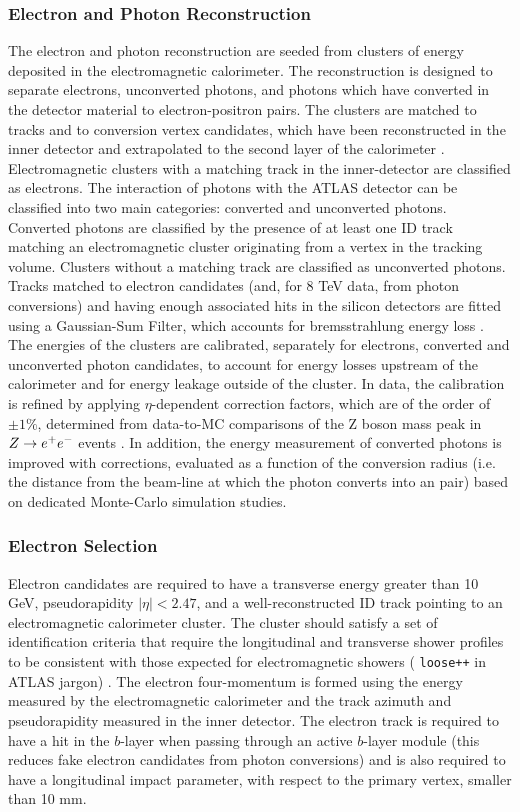 \subsubsection*{Electron and Photon Reconstruction}
The electron and photon reconstruction are seeded from clusters of energy deposited
in the electromagnetic calorimeter. The reconstruction is designed to separate 
electrons, unconverted photons, and photons which have converted in the detector
material to electron-positron pairs. The clusters are matched to tracks and to 
conversion vertex candidates, which have 
been reconstructed in the inner detector and extrapolated to the second layer of
the calorimeter \cite{ATL-PHYS-PUB-2011-007}.
Electromagnetic clusters with a matching track in the inner-detector are classified
as electrons. The interaction of photons with the ATLAS detector can be
classified into two main categories: converted and unconverted photons. Converted
photons are classified by the presence of at least one ID track matching an
electromagnetic cluster originating from a vertex in the tracking volume. Clusters
without a matching track are classified as unconverted photons. Tracks matched
to electron candidates (and, for 8 TeV data, from photon conversions) and having
enough associated hits in the silicon detectors are fitted using a Gaussian-Sum
Filter, which accounts for bremsstrahlung energy loss \cite{ATLAS-CONF-2012-047}.
The energies of the clusters are calibrated, separately for electrons, converted
and unconverted photon candidates, to account for energy losses upstream of the 
calorimeter and for energy leakage outside of the cluster. In data, the calibration 
is refined by applying $\eta$-dependent correction factors, which are of the order
of $\pm 1\%$, determined from data-to-MC comparisons of the Z boson mass peak in
$Z \rightarrow e^+ e^-$ events \cite{Aad:2011mk}. 
In addition, the energy measurement of converted
photons is improved with corrections, evaluated as a function of the conversion
radius (i.e. the distance from the beam-line at which the photon converts into an
\epem pair) based on dedicated Monte-Carlo simulation studies.

\subsubsection*{Electron Selection}
Electron candidates are required to have a transverse energy greater than 10 GeV,
pseudorapidity $|\eta| < 2.47$, and a well-reconstructed ID track pointing to an 
electromagnetic calorimeter cluster. The cluster should satisfy a set of 
identification criteria that require the longitudinal and transverse shower
profiles to be consistent with those expected for electromagnetic showers (
{\tt loose++} in ATLAS jargon) \cite{Aad:2011mk}. The electron four-momentum is formed
using the energy measured by the electromagnetic 
calorimeter and the track azimuth
and pseudorapidity measured in the inner detector. The electron track is required
to have a hit in the $b$-layer when passing through an active $b$-layer module
(this reduces fake electron candidates from photon conversions)
and is also required to have a longitudinal impact parameter, with respect to
the primary vertex, smaller than 10 mm.

